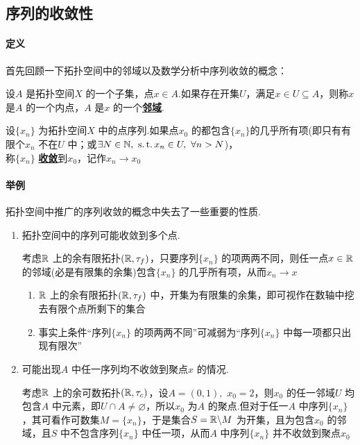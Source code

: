 \newpage

\subsection{序列的收敛性}
\paragraph{定义}
	首先回顾一下拓扑空间中的邻域以及数学分析中序列收敛的概念：
	\begin{defn}\label{def 1.1.3}
		设$A$ 是拓扑空间$X$ 的一个子集，点$x \in A$.如果存在开集$U$，满足$x \in U \subseteq A$，则称$x$ 是$A$ 的一个内点，$A$ 是$x$ 的一个\underline{\textbf{邻域}}.
	\end{defn}

	\begin{defn}\label{def 1.1.4}
		设$\{ x_n \}$ 为拓扑空间$X$ 中的点序列.如果点$x_0$ 的都包含$\{ x_n \}$的几乎所有项(即只有有限个$x_n$ 不在$U$ 中；或$\exists N \in \mathbb{N} , \,\, \operatorname{s.t.} x_n \in U , \,\, \forall n > N$)，\\
		称$\{ x_n \}$ \underline{\textbf{收敛}}到$x_0$，记作$x_n \to x_0$
	\end{defn}

\paragraph{举例}
	拓扑空间中推广的序列收敛的概念中失去了一些重要的性质.
	\begin{enumerate}
		\item 拓扑空间中的序列可能收敛到多个点.
		\begin{example}\label{ex 1.1.1}
			考虑$\mathbb{R}$ 上的余有限拓扑$(\mathbb{R} , \tau_f)$，只要序列$\{ x_n \}$ 的项两两不同，则任一点$x \in \mathbb{R}$ 的邻域(必是有限集的余集)包含$\{ x_n \}$ 的几乎所有项，从而$x_n \to x$
		\end{example}
	
		\begin{rmk}
			\begin{enumerate}
				\item[\rmnum{1}] $\mathbb{R}$ 上的余有限拓扑$(\mathbb{R} , \tau_f)$ 中，开集为有限集的余集，即可视作在数轴中挖去有限个点所剩下的集合
				
				\item[\rmnum{2}] 事实上条件“序列$\{ x_n \}$ 的项两两不同”可减弱为“序列$\{ x_n \}$ 中每一项都只出现有限次”
			\end{enumerate}
		\end{rmk}
	
		\item 可能出现$A$ 中任一序列均不收敛到聚点$x$ 的情况.
		\begin{example}\label{ex 1.1.2}
			考虑$\mathbb{R}$ 上的余可数拓扑$(\mathbb{R} , \tau_c)$，设$A = (0 , 1) , \,\, x_0 = 2$，则$x_0$ 的任一邻域$U$ 均包含$A$ 中元素，即$U \cap A \neq \varnothing$，所以$x_0$ 为$A$ 的聚点.但对于任一$A$ 中序列$\{ x_n \}$，其可看作可数集$M = \{ x_n \}$，于是集合$S = \mathbb{R} \backslash M$ 为开集，且为包含$x_0$ 的邻域，且$S$ 中不包含序列$\{ x_n \}$ 中任一项，从而$A$ 中序列$\{ x_n \}$ 并不收敛到聚点$x_0$
		\end{example}
	\end{enumerate}

